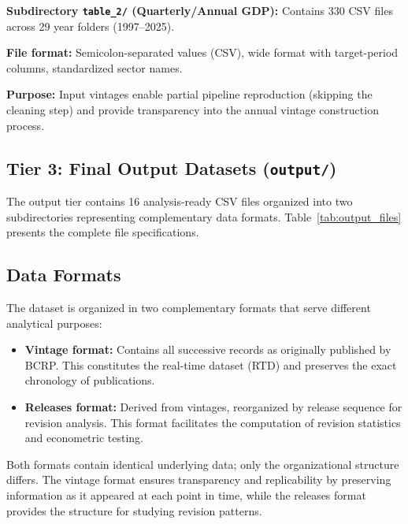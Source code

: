 \documentclass[12pt]{article}
\begin{document}
\textbf{Subdirectory \texttt{table\_2/} (Quarterly/Annual GDP):} Contains 330 CSV files across 29 year folders (1997--2025).

\textbf{File format:} Semicolon-separated values (CSV), wide format with target-period columns, standardized sector names.

\textbf{Purpose:} Input vintages enable partial pipeline reproduction (skipping the cleaning step) and provide transparency into the annual vintage construction process.

\subsection*{Tier 3: Final Output Datasets (\texttt{output/})}

The output tier contains 16 analysis-ready CSV files organized into two subdirectories representing complementary data formats. Table~\ref{tab:output_files} presents the complete file specifications.

\begin{table}[h]
\centering
\caption{Output dataset file specifications}
\label{tab:output_files}

\resizebox{\textwidth}{!}{%

}

\end{table}

\subsection*{Data Formats}

The dataset is organized in two complementary formats that serve different analytical purposes:

\begin{itemize}
    \item \textbf{Vintage format:} Contains all successive records as originally published by BCRP. This constitutes the real-time dataset (RTD) and preserves the exact chronology of publications.
    \item \textbf{Releases format:} Derived from vintages, reorganized by release sequence for revision analysis. This format facilitates the computation of revision statistics and econometric testing.
\end{itemize}

Both formats contain identical underlying data; only the organizational structure differs. The vintage format ensures transparency and replicability by preserving information as it appeared at each point in time, while the releases format provides the structure  for studying revision patterns.
\end{document}
